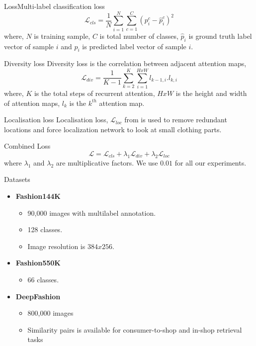 \documentclass[handout]{beamer}
\begin{document}
\begin{frame}{Loss}{Multi-label classification loss}
      \begin{equation}
        \mathcal{L}_{cls} = \frac{1}{N} \sum^N_{i=1}\sum^C_{c=1}(p^c_i-\hat{p}^c_i)^2
      \end{equation}
      where, $N$ is training sample, $C$ is total number of classes, $\hat{p}_i$ is ground truth label vector of sample $i$ and $p_i$ is predicted label vector of sample $i$.
\end{frame}

\begin{frame}{Diversity loss}
  Diversity loss is the correlation between adjacent attention maps,
  \begin{equation}
    \mathcal{L}_{div} = \frac{1}{K-1} \sum^K_{k=2}\sum^{HxW}_{i=1} l_{k-1,i}.l_{k,i}
  \end{equation}
  where, $K$ is the total steps of recurrent attention, $HxW$ is the height and width of attention maps, $l_{k}$ is the $k^{th}$ attention map.
\end{frame}

\begin{frame}{Localisation loss}
  Localisation loss, $\mathcal{L}_{loc}$ from \cite{} is used to remove redundant locations and force localization network to look at small clothing parts.
\end{frame}

\begin{frame}{Combined Loss}
  \begin{equation}
    \mathcal{L} = \mathcal{L}_{cls} + \lambda_1\mathcal{L}_{div} + \lambda_2\mathcal{L}_{loc}
  \end{equation}
  where $\lambda_1$ and $\lambda_2$ are multiplicative factors. We use $0.01$ for all our experiments.
\end{frame}

\begin{frame}{Datasets}
  \begin{itemize}
    \item \textbf{Fashion144K}
    \begin{itemize}
      \item 90,000 images with multilabel annotation.
      \item 128 classes.
      \item Image resolution is $384x256$.
    \end{itemize}

    \item \textbf{Fashion550K}
      \begin{itemize}
        \item 66 classes.
      \end{itemize}

    \item \textbf{DeepFashion}
      \begin{itemize}
        \item 800,000 images
        \item Similarity pairs is available for consumer-to-shop and in-shop retrieval tasks
      \end{itemize}
  \end{itemize}
\end{frame}
\end{document}
